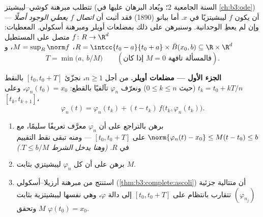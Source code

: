 \begin{problem}[{مسألة نهاية الأسبوع --- وجود حلول المعادلة
$x' = f(t, x)$ دون شرط ليبشيتز}]\label{pb:b3:complete:1}
تتطلب مبرهنة كوشي--ليبشيتز (السنة الجامعية 2؛ ويُعاد البرهان
عليها في \cref{ch:b3:ode}) أن يكون $f$ ليبشيتزيًا في $x$. أما بيانو
(1890) فقد أثبت أن \emph{اتصال $f$ يعطي الوجود أصلًا} --- وإن
لم يعطِ الوحدانية. وسنبرهن على ذلك بمضلعات أويلر ومبرهنة
أسكولي. المعطيات: $f \colon R
\to \R^d$ متصل على المستطيل $R = \intcc{t_0 - a}{t_0
+ a}\times \bar B(x_0, b) \subseteq \R\times\R^d$، $M =
\sup_R\norm f$،
و
\[
T = \min\bigl(a,\ b/M\bigr)
\qquad (\text{إذا كان } M = 0 \text{ فالمسألة تافهة}).
\]

\medskip
\noindent\textbf{الجزء الأول --- مضلعات أويلر.} من أجل
$n \geq 1$، نجزّئ $[t_0, t_0 + T]$ بالنقط $t_k = t_0 + kT/n$ (حيث $0 \leq k
\leq n$)
ونعرّف $\varphi_n$ تآلفيًا بالقطع: $\varphi_n(t_0) = x_0$، وعلى
$[t_k, t_{k+1}]$،
\[
\varphi_n(t) = \varphi_n(t_k) + (t -
t_k)\,f\bigl(t_k, \varphi_n(t_k)\bigr).
\]
\begin{enumerate}
  \item برهن بالتراجع على أن $\varphi_n$ معرَّف تعريفًا سليمًا،
        مع $\norm{\varphi_n(t) - x_0} \leq M(t - t_0) \leq b$ على $[t_0, t_0 + T]$ --- ومنه تبقى نقط
        التقييم في $R$. \emph{(وهنا يدخل الشرط $T \leq b/M$.)}
  \item برهن على أن كل $\varphi_n$ ليبشيتزي بثابت $M$.
  \item استنتج من مبرهنة أرزيلا--أسكولي (\cref{thm:b3:complete:ascoli}) أن
        متتالية جزئية $(\varphi_{n_j})$ تتقارب بانتظام على $[t_0, t_0 +
        T]$ إلى
        دالة $\varphi$، وهي نفسها ليبشيتزية بثابت $M$ وتحقق
        $\varphi(t_0) = x_0$.
\end{enumerate}


\end{problem}
